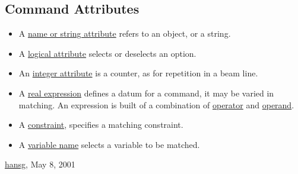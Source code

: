 




\subsection{Command Attributes}
\begin{itemize}
	\item A \href{name.html}{name or string attribute} refers to an object, or a string. 
	\item A \href{logical.html}{logical attribute} selects or deselects an option. 
	\item An \href{integer.html}{integer attribute} is a counter, as for repetition in a beam line. 
	\item A \href{expression.html}{real expression} defines a datum for a command, it may be varied in matching. An expression is built of a combination of \href{expression.html#operator}{operator} and \href{expression.html#operand}{operand}. 
	\item A \href{constraint.html}{constraint}, specifies a matching constraint. 
	\item A \href{variable.html}{variable name} selects a variable to be matched. 
\end{itemize}\href{http://www.cern.ch/Hans.Grote/hansg_sign.html}{hansg}, May 8, 2001 

